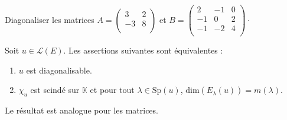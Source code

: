 \documentclass[french,11pt,twoside]{VcCours}
\begin{document}
\begin{Exemple}{}


\end{Exemple}

\newpage 

\begin{ApplicationDirecte}{} Diagonaliser les matrices $A= \begin{pmatrix}
3 & 2 \\
-3 & 8 \\
\end{pmatrix}$ et $B = \begin{pmatrix}
2 & -1 & 0 \\
-1 & 0 & 2 \\
-1 & -2 & 4 \\
\end{pmatrix}\cdot$
\end{ApplicationDirecte}


\begin{Corollaire}{} 
	Soit $u \in \mathcal{L}(E)$. 
	Les assertions suivantes sont équivalentes : 
\begin{enumerate}
\item $u$ est diagonalisable.
\item $\chi_u$ est scindé sur $\mathbb{K}$ et pour tout $\lambda \in \textrm{Sp}(u)$, $\textrm{dim}(E_{\lambda}(u))= m(\lambda)$.
\end{enumerate}
Le résultat est analogue pour les matrices.
\end{Corollaire}
\end{document}
